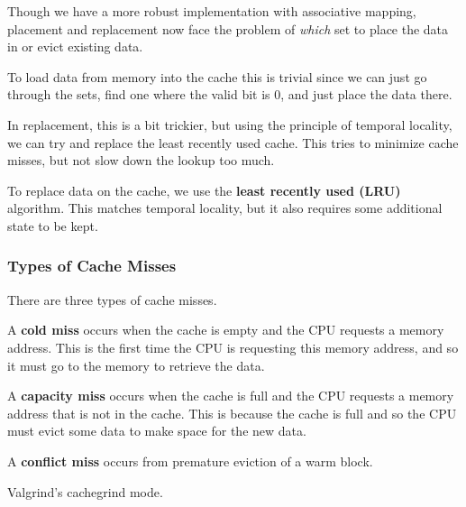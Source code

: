     Though we have a more robust implementation with associative mapping, placement and replacement now face the problem of \textit{which} set to place the data in or evict existing data. 

    \begin{theorem}[Placement]
      To load data from memory into the cache this is trivial since we can just go through the sets, find one where the valid bit is $0$, and just place the data there.  
    \end{theorem}

    In replacement, this is a bit trickier, but using the principle of temporal locality, we can try and replace the least recently used cache. This tries to minimize cache misses, but not slow down the lookup too much. 

    \begin{theorem}[Replacement]
      To replace data on the cache, we use the \textbf{least recently used (LRU)} algorithm. This matches temporal locality, but it also requires some additional state to be kept. 
    \end{theorem}

  \subsubsection{Types of Cache Misses} 

    There are three types of cache misses. 

    \begin{definition}
      A \textbf{cold miss} occurs when the cache is empty and the CPU requests a memory address. This is the first time the CPU is requesting this memory address, and so it must go to the memory to retrieve the data.
    \end{definition}
    
    \begin{definition}
      A \textbf{capacity miss} occurs when the cache is full and the CPU requests a memory address that is not in the cache. This is because the cache is full and so the CPU must evict some data to make space for the new data.
    \end{definition}

    \begin{definition}
      A \textbf{conflict miss} occurs from premature eviction of a warm block. 
    \end{definition}

  Valgrind's cachegrind mode. 

